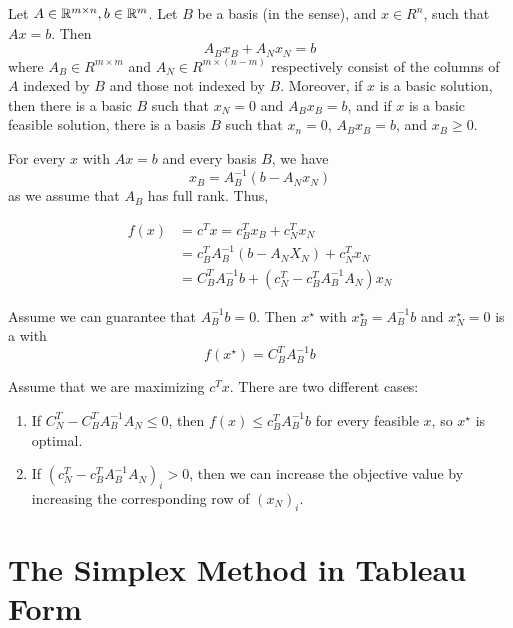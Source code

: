 Let $A \in \mathbb{R}^{m \times n}, b \in \mathbb{R}^{m}$.  Let $B$ be a basis (in the
\bfs sense), and $x \in R^{n}$, such that $Ax = b$.  Then
\begin{equation}
  \label{eq:20}
  A_{B} x_{B} + A_{N} x_{N} = b
\end{equation} where $A_{B} \in R^{m \times m}$ and $A_{N} \in R^{m
  \times ( n - m)}$ respectively consist of the columns of $A$ indexed
by $B$ and those not indexed by $B$. Moreover, if $x$ is a basic
solution, then there is a basic $B$ such that $x_{N} = 0$ and $A_{B}
x_{B} = b$, and if $x$ is a basic feasible solution, there is a basis
$B$ such that $x_{n} = 0$, $A_{B} x_{B} = b$, and $x_{B} \geq 0$.

For every $x$ with $Ax = b$ and every basis $B$, we have
\begin{equation}
  \label{eq:21}
  x_{B} = A_{B}^{-1} (b - A_{N} x_{N})
\end{equation} as we assume that $A_{B}$ has full rank.  Thus,

\begin{align}
  \label{eq:23}
  f(x) & = c^{T} x = c_{B}^{T} x_{B} + c^{T}_{N} x_{N}             \\
       & = c_{B}^{T} A_{B}^{-1}(b - A_{N} X_{N}) + c^{T}_{N} x_{N} \\
       & = C_{B}^{T} A_{B}^{-1} b + (c_{N}^{T} - c_{B}^{T} A_{B}^{-1} A_{N}) x_{N}
\end{align}

Assume we can guarantee that $A_{B}^{-1} b = 0$.  Then $x^{\star}$ with
$x_{B}^{\star} = A_{B}^{-1} b$ and $x_{N}^{\star} = 0$ is a \bfs with
\begin{equation}
  \label{eq:24}
  f(x^{\star}) = C_{B}^{T} A_{B}^{-1} b
\end{equation}

Assume that we are maximizing $c^{T} x$.  There are two different
cases:
\begin{enumerate}
\item If $C_{N}^{T} - C_{B}^{T} A_{B}^{-1} A_{N} \leq 0$, then $f(x)
  \leq c_{B}^{T} A_{B}^{-1} b$ for every feasible $x$, so $x^{\star}$
  is optimal.
\item If $(c_{N}^{T} - c_{B}^{T} A_{B}^{-1} A_{N})_{i} > 0$, then we
  can increase the objective value by increasing the corresponding row
  of $(x_{N})_{i}$.
\end{enumerate}

\section{The Simplex Method in Tableau Form}
\label{sec:simpl-meth-tabl}



